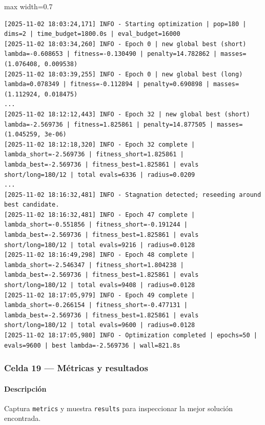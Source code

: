 \begin{listing}[H]
\caption{Ejemplo Salida}
\begin{adjustbox}{max width=0.7\textwidth}
\begin{minipage}{\textwidth}
\begin{verbatim}
[2025-11-02 18:03:24,171] INFO - Starting optimization | pop=180 | dims=2 | time_budget=1800.0s | eval_budget=16000
[2025-11-02 18:03:34,260] INFO - Epoch 0 | new global best (short) lambda=-0.608653 | fitness=-0.130490 | penalty=14.782862 | masses=(1.076408, 0.009538)
[2025-11-02 18:03:39,255] INFO - Epoch 0 | new global best (long) lambda=0.078349 | fitness=-0.112894 | penalty=0.690898 | masses=(1.112924, 0.018475)
...
[2025-11-02 18:12:12,443] INFO - Epoch 32 | new global best (short) lambda=-2.569736 | fitness=1.825861 | penalty=14.877505 | masses=(1.045259, 3e-06)
[2025-11-02 18:12:18,320] INFO - Epoch 32 complete | lambda_short=-2.569736 | fitness_short=1.825861 | lambda_best=-2.569736 | fitness_best=1.825861 | evals short/long=180/12 | total evals=6336 | radius=0.0209
...
[2025-11-02 18:16:32,481] INFO - Stagnation detected; reseeding around best candidate.
[2025-11-02 18:16:32,481] INFO - Epoch 47 complete | lambda_short=-0.551856 | fitness_short=-0.191244 | lambda_best=-2.569736 | fitness_best=1.825861 | evals short/long=180/12 | total evals=9216 | radius=0.0128
[2025-11-02 18:16:49,298] INFO - Epoch 48 complete | lambda_short=-2.546347 | fitness_short=1.804238 | lambda_best=-2.569736 | fitness_best=1.825861 | evals short/long=180/12 | total evals=9408 | radius=0.0128
[2025-11-02 18:17:05,979] INFO - Epoch 49 complete | lambda_short=-0.266154 | fitness_short=-0.477131 | lambda_best=-2.569736 | fitness_best=1.825861 | evals short/long=180/12 | total evals=9600 | radius=0.0128
[2025-11-02 18:17:05,980] INFO - Optimization completed | epochs=50 | evals=9600 | best lambda=-2.569736 | wall=821.8s
\end{verbatim}
\end{minipage}
\end{adjustbox}
\end{listing}

\subsubsection*{Celda 19 — Métricas y resultados}
\paragraph{Descripción} Captura \texttt{metrics} y muestra \texttt{results} para inspeccionar la mejor solución encontrada.

